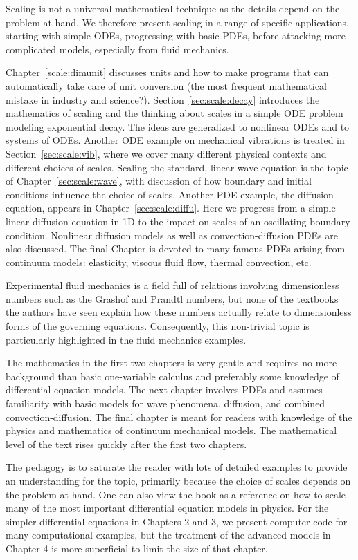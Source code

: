 \documentclass[graybox,envcountchap,sectrefs,final]{svmonodo}
\begin{document}
Scaling is not a universal mathematical technique as the details
depend on the problem at hand. We therefore present scaling in a range
of specific applications, starting with simple ODEs, progressing with
basic PDEs, before attacking more complicated models, especially from
fluid mechanics.

Chapter~\ref{scale:dimunit} discusses units and how to make programs
that can automatically take care of unit conversion (the most frequent
mathematical mistake in industry and science?).  Section~\ref{sec:scale:decay} introduces the mathematics of scaling and the
thinking about scales in a simple ODE problem modeling exponential
decay. The ideas are generalized to nonlinear ODEs and to systems of
ODEs.  Another ODE example on mechanical vibrations is treated in
Section~\ref{sec:scale:vib}, where we cover many different physical
contexts and different choices of scales.  Scaling the standard,
linear wave equation is the topic of Chapter~\ref{sec:scale:wave}, with
discussion of how boundary and initial conditions influence the choice
of scales.  Another PDE example, the diffusion equation, appears in
Chapter~\ref{sec:scale:diffu}. Here we progress from a simple linear
diffusion equation in 1D to the impact on scales of an oscillating
boundary condition. Nonlinear diffusion models as well as
convection-diffusion PDEs are also discussed.  The final Chapter is
devoted to many famous PDEs arising from continuum models: elasticity,
viscous fluid flow, thermal convection, etc.

Experimental fluid mechanics is a field full of relations involving
dimensionless numbers such as the Grashof and Prandtl
numbers, but none of the textbooks the authors have seen explain how
these numbers actually relate to dimensionless forms of the governing
equations. Consequently, this non-trivial topic is particularly
highlighted in the fluid mechanics examples.

The mathematics in the first two chapters is very gentle and requires
no more background than basic one-variable calculus and preferably
some knowledge of differential equation models. The next chapter
involves PDEs and assumes familiarity with basic models for wave
phenomena, diffusion, and combined convection-diffusion. The final
chapter is meant for readers with knowledge of the physics and
mathematics of continuum mechanical models. The mathematical level of
the text rises quickly after the first two chapters.

The pedagogy is to saturate the reader with lots of detailed examples to
provide an understanding for the topic, primarily because the choice
of scales depends on the problem at hand. One can also view the book
as a reference on how to scale many of the most important differential
equation models in physics.  For the simpler differential equations in
Chapters 2 and 3, we present computer code for many computational
examples, but the treatment of the advanced models in Chapter 4 is
more superficial to limit the size of that chapter.
\end{document}
